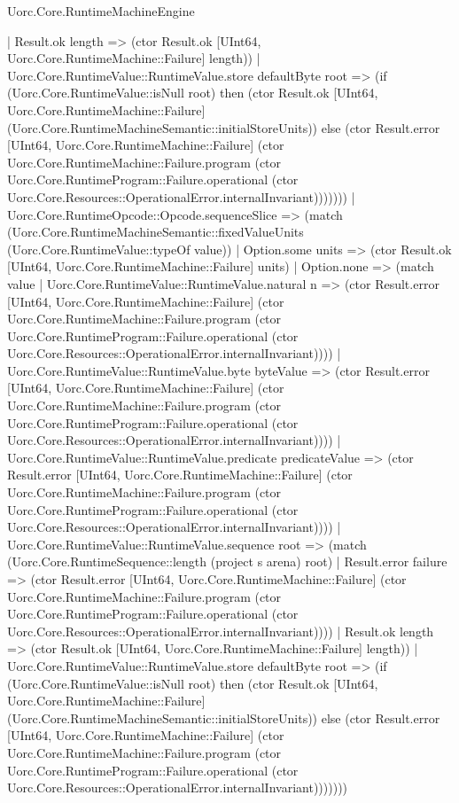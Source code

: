 \begin{lexlean}{Uorc.Core.RuntimeMachineEngine}
\begin{semanticmodule}
{                | Result.ok length => (ctor Result.ok [UInt64, Uorc.Core.RuntimeMachine::Failure] length))
              | Uorc.Core.RuntimeValue::RuntimeValue.store defaultByte root => (if (Uorc.Core.RuntimeValue::isNull root) then (ctor Result.ok [UInt64, Uorc.Core.RuntimeMachine::Failure] (Uorc.Core.RuntimeMachineSemantic::initialStoreUnits)) else (ctor Result.error [UInt64, Uorc.Core.RuntimeMachine::Failure] (ctor Uorc.Core.RuntimeMachine::Failure.program (ctor Uorc.Core.RuntimeProgram::Failure.operational (ctor Uorc.Core.Resources::OperationalError.internalInvariant)))))))
          | Uorc.Core.RuntimeOpcode::Opcode.sequenceSlice => (match (Uorc.Core.RuntimeMachineSemantic::fixedValueUnits (Uorc.Core.RuntimeValue::typeOf value))
            | Option.some units => (ctor Result.ok [UInt64, Uorc.Core.RuntimeMachine::Failure] units)
            | Option.none => (match value
              | Uorc.Core.RuntimeValue::RuntimeValue.natural n => (ctor Result.error [UInt64, Uorc.Core.RuntimeMachine::Failure] (ctor Uorc.Core.RuntimeMachine::Failure.program (ctor Uorc.Core.RuntimeProgram::Failure.operational (ctor Uorc.Core.Resources::OperationalError.internalInvariant))))
              | Uorc.Core.RuntimeValue::RuntimeValue.byte byteValue => (ctor Result.error [UInt64, Uorc.Core.RuntimeMachine::Failure] (ctor Uorc.Core.RuntimeMachine::Failure.program (ctor Uorc.Core.RuntimeProgram::Failure.operational (ctor Uorc.Core.Resources::OperationalError.internalInvariant))))
              | Uorc.Core.RuntimeValue::RuntimeValue.predicate predicateValue => (ctor Result.error [UInt64, Uorc.Core.RuntimeMachine::Failure] (ctor Uorc.Core.RuntimeMachine::Failure.program (ctor Uorc.Core.RuntimeProgram::Failure.operational (ctor Uorc.Core.Resources::OperationalError.internalInvariant))))
              | Uorc.Core.RuntimeValue::RuntimeValue.sequence root => (match (Uorc.Core.RuntimeSequence::length (project s arena) root)
                | Result.error failure => (ctor Result.error [UInt64, Uorc.Core.RuntimeMachine::Failure] (ctor Uorc.Core.RuntimeMachine::Failure.program (ctor Uorc.Core.RuntimeProgram::Failure.operational (ctor Uorc.Core.Resources::OperationalError.internalInvariant))))
                | Result.ok length => (ctor Result.ok [UInt64, Uorc.Core.RuntimeMachine::Failure] length))
              | Uorc.Core.RuntimeValue::RuntimeValue.store defaultByte root => (if (Uorc.Core.RuntimeValue::isNull root) then (ctor Result.ok [UInt64, Uorc.Core.RuntimeMachine::Failure] (Uorc.Core.RuntimeMachineSemantic::initialStoreUnits)) else (ctor Result.error [UInt64, Uorc.Core.RuntimeMachine::Failure] (ctor Uorc.Core.RuntimeMachine::Failure.program (ctor Uorc.Core.RuntimeProgram::Failure.operational (ctor Uorc.Core.Resources::OperationalError.internalInvariant)))))))
}
\end{semanticmodule}
\end{lexlean}
